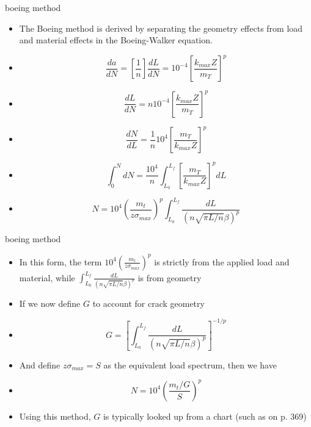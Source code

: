 \documentclass[10pt]{beamer}
\begin{document}
\begin{frame}{boeing method}
	\begin{itemize}[<+->]
		\item The Boeing method is derived by separating the geometry effects from load and material effects in the Boeing-Walker equation.
		\item[] \begin{equation}
		\frac{da}{dN} = \left[\frac{1}{n}\right]\frac{dL}{dN} = 10^{-4} \left[\frac{k_{max}Z}{m_T}\right]^p
		\end{equation}
		\item[] \begin{equation}
		\frac{dL}{dN} = n 10^{-4} \left[\frac{k_{max}Z}{m_T}\right]^p
		\end{equation}
		\item[] \begin{equation}
		\frac{dN}{dL} = \frac{1}{n} 10^{4} \left[\frac{m_T}{k_{max}Z}\right]^p
		\end{equation}
		\item[] \begin{equation}
		\int_{0}^{N}dN = \frac{10^{4}}{n}  \int_{L_0}^{L_f} \left[\frac{m_T}{k_{max}Z}\right]^p dL
		\end{equation}
		\item[] \begin{equation}
		N = 10^{4} \left(\frac{m_t}{z\sigma_{max}}\right)^p  \int_{L_0}^{L_f} \frac{dL}{\left( n\sqrt{\pi L/n}\beta\right)^p}
		\end{equation}
	\end{itemize}
\end{frame}

\begin{frame}{boeing method}
	\begin{itemize}[<+->]
		\item In this form, the term $10^{4} \left(\frac{m_t}{z\sigma_{max}}\right)^p$ is strictly from the applied load and material, while $\int_{L_0}^{L_f} \frac{dL}{\left( n\sqrt{\pi L/n}\beta\right)^p}$ is from geometry
		\item If we now define $G$ to account for crack geometry
		\item[] \begin{equation}
		G = \left[ \int_{L_0}^{L_f} \frac{dL}{\left( n\sqrt{\pi L/n}\beta\right)^p} \right] ^{-1/p}
		\end{equation}
		\item And define $z \sigma_{max} = S$ as the equivalent load spectrum, then we have
		\item[] \begin{equation}
		\label{eq:boeing}
		N = 10^4 \left(\frac{m_t/G}{S}\right)^p
		\end{equation}
		\item Using this method, $G$ is typically looked up from a chart (such as on p. 369)
	\end{itemize}
\end{frame}
\end{document}
